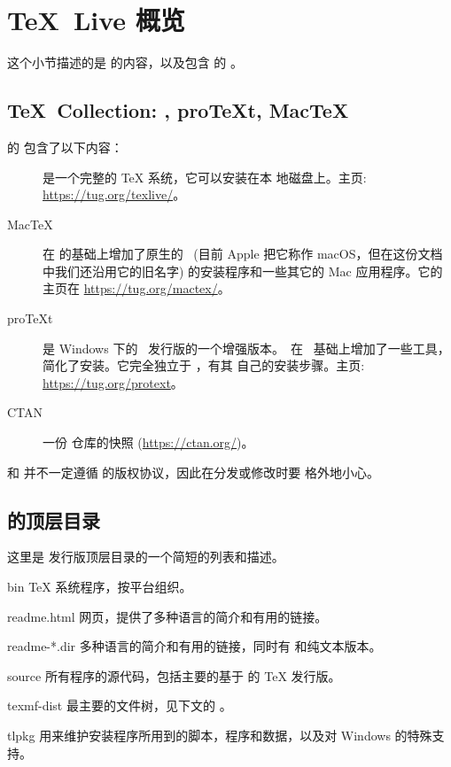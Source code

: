 \documentclass{article}
\begin{document}
\section{\protect\TeX\protect\ Live 概览}
\label{sec:overview-tl}

这个小节描述的是 \TL{} 的内容，以及包含 \TL{} 的 \TK{}。

\subsection{\protect\TeX\protect\ Collection: \protect\TL,
            pro\protect\TeX{}t, Mac\protect\TeX}
\label{sec:tl-coll-dists}

\TK{} 的 \DVD{} 包含了以下内容：

\begin{description}

\item [\TL] 是一个完整的 \TeX{} 系统，它可以安装在本
地磁盘上。主页: \url{https://tug.org/texlive/}。

\item [Mac\TeX] 在 \TL{} 的基础上增加了原生的 \MacOSX\ (目前 Apple 把它称作
macOS，但在这份文档中我们还沿用它的旧名字) 的安装程序和一些其它的
Mac 应用程序。它的主页在 \url{https://tug.org/mactex/}。

\item [pro\TeX{}t] 是 Windows 下的 \MIKTEX\ 发行版的一个增强版本。\ProTeXt\ 在
\MIKTEX\ 基础上增加了一些工具，简化了安装。它完全独立于 \TL{}，有其
自己的安装步骤。主页: \url{https://tug.org/protext}。

\item [CTAN] 一份 \CTAN{} 仓库的快照 (\url{https://ctan.org/})。

\end{description}

\CTAN{} 和  并不一定遵循 \TL{} 的版权协议，因此在分发或修改时要
格外地小心。

\subsection{\protect\TL{} 的顶层目录}
\label{sec:tld}

这里是 \TL{} 发行版顶层目录的一个简短的列表和描述。

\begin{ttdescription}
\item[bin] \TeX{} 系统程序，按平台组织。
%
\item[readme.html] 网页，提供了多种语言的简介和有用的链接。
\item[readme-*.dir] \TL{} 多种语言的简介和有用的链接，同时有 \HTML{}
和纯文本版本。

%
\item[source] 所有程序的源代码，包括主要的基于 \Webc{} 的 \TeX{}
  发行版。
%
\item[texmf-dist] 最主要的文件树，见下文的 。
%
\item[tlpkg] 用来维护安装程序所用到的脚本，程序和数据，以及对
Windows 的特殊支持。
\end{ttdescription}
\end{document}
